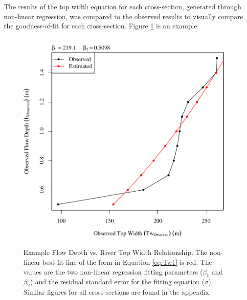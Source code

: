 \begin{linenumbers}
The results of the top width equation for each cross-section, generated through non-linear regression, was compared to the observed results to visually compare the goodness-of-fit for each cross-section.  Figure \ref{fig:exampleTwVsH} is an example
\begin{figure}[htbp]
	\centering
	\includegraphics[width=6in]{"Figures/Results_USR/Stochastic/Survey Tw vs H-Section 1"}
	\caption[Example Flow Depth vs. River Top Width Relationship.]{Example Flow Depth vs. River Top Width Relationship.  The non-linear best fit line of the form in Equation \ref{eq:Tw1} is red.  The values are the two non-linear regression fitting parameters ($\beta_1$ and $\beta_2$) and the residual standard error for the fitting equation ($\sigma$).  Similar figures for all cross-sections are found in the appendix.}
	\label{fig:exampleTwVsH}
\end{figure}


\end{linenumbers}
